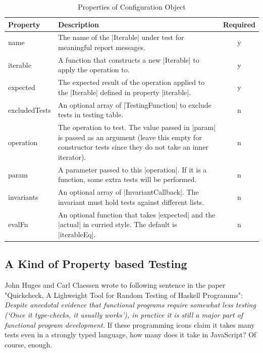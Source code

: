 \begin{table}[H]
  \center
  \begin{tabular}{ l m{10cm} c}
    \textbf{Property} & \textbf{Description} & \textbf{Required}\\
    \hline
    name            & The name of the |Iterable| under test for meaningful 
                      report messages. 
                    & y 
                    \\ 
    iterable        & A function that constructs a new |Iterable| to apply the 
                      operation to. 
                    & y 
                    \\  
    expected        & The expected result of the operation applied to the |Iterable|
                      defined in property |iterable|.
                    & 
                    y  \\ 
    excludedTests   & An optional array of |TestingFunction| to exclude tests
                      in testing table. 
                    & n 
                    \\
    operation       & The operation to test. The value passed in |param| is
                      passed as an argument (leave this empty for constructor 
                      tests since they do not take an inner iterator). 
                    & n 
                    \\
    param           & A parameter passed to this |operation|. If it is a
                      function, some extra tests will be performed. 
                    & n
                    \\ 
    invariants      & An optional array of |InvariantCallback|. The invariant 
                      must hold tests against different lists. 
                    & n
                    \\
    evalFn          & An optional function that takes |expected| and the |actual| 
                      in curried style. The default is |iterableEq|.
                    & n 
                    \\
  \end{tabular}
  \caption{Properties of Configuration Object}
\label{tab:testing_table}
\end{table}


\subsection{A Kind of Property based Testing}
\label{sub:A Kind of Property based Testing}
John Huges and Carl Claessen wrote to following sentence in the paper
"Quickcheck, A Lighweight Tool for Random Testing of Haskell Programms":
\textit{
Despite anecdotal evidence that functional programs require somewhat less
testing (`Once it type-checks, it usually works'), in practice it is still a 
major part of functional program development.}
If these programming icons claim it takes many tests even in a strongly typed 
language, how many does it take in JavaScript? Of course, enough.

